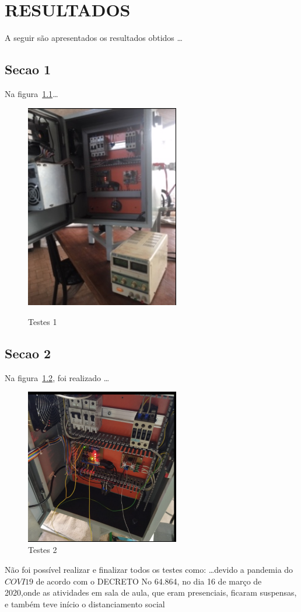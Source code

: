 \chapter{RESULTADOS}\label{chap:resuldatos}

A seguir são apresentados os resultados obtidos \ldots

\section{Secao 1}\label{sec:Secao_1}
Na figura~\ref{fig:figura50}\ldots

\begin{figure}[H]
    \centering
    \caption{Testes 1}
    \includegraphics[width=0.6\textwidth]{figuras/figu50.png}
    \label{fig:figura50}
\end{figure}

\section{Secao 2}\label{sec:Secao_2}

Na figura~\ref{fig:figura44}, foi realizado \ldots

\begin{figure}[H]
    \centering
    \caption{Testes 2}\label{fig:figura44}
    \includegraphics[width=0.6\textwidth]{figuras/figu44.png}
\end{figure}

Não foi possível realizar e finalizar todos os testes como: \ldots devido a pandemia do $COVI19$ de acordo com o DECRETO No 64.864, no dia 16 de março de 2020,onde as atividades em sala de aula, que eram presenciais, ficaram suspensas, e também teve início o distanciamento social
